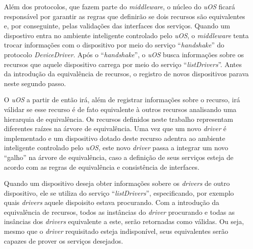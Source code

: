 Além dos protocolos, que fazem parte do \emph{middleware}, o núcleo do \emph{uOS} ficará responsável por garantir as regras que definirão se dois recursos são equivalentes e, por conseguinte, pelas validações das interfaces dos serviços. Quando um dispostivo entra no ambiente inteligente controlado pelo \emph{uOS}, o \emph{middleware} tenta trocar informações com o dispositivo por meio do serviço ``\emph{handshake}'' do protocolo \emph{DeviceDriver}. Após o ``\emph{handshake}'', o \emph{uOS} busca informações sobre os recursos que aquele dispositivo carrega por meio do serviço ``\emph{listDrivers}''. Antes da introdução da equivalência de recursos, o registro de novos dispositivos parava neste segundo passo. 

O \emph{uOS} a partir de então irá, além de registrar informações sobre o recurso, irá válidar se esse recurso é de fato equivalente à outros recursos analisando uma hierarquia de equivalência. Os recursos definidos neste trabalho representam diferentes raízes na árvore de equivalência. Uma vez que um novo \emph{driver} é implementado e um dispositivo dotado deste recurso adentra ao ambiente inteligente controlado pelo \emph{uOS}, este novo \emph{driver} passa a integrar um novo ``galho'' na árvore de equivalência, caso a definição de seus serviços esteja de acordo com as regras de equivalência e consistência de interfaces.

Quando um dispositivo deseja obter informações sobere os \emph{drivers} de outro dispositivo, ele se utiliza do serviço ``\emph{listDrivers}'', especificando, por exemplo quais \emph{drivers} aquele dispoisito estava procurando. Com a introdução da equivalência de recursos, todos as instâncias do \emph{driver} procurando e todas as insâncias dos \emph{drivers} equivalente a este, serão retornadas como válidas. Ou seja, mesmo que o \emph{driver} requisitado esteja indisponível, seus equivalentes serão capazes de prover os serviços desejados.
